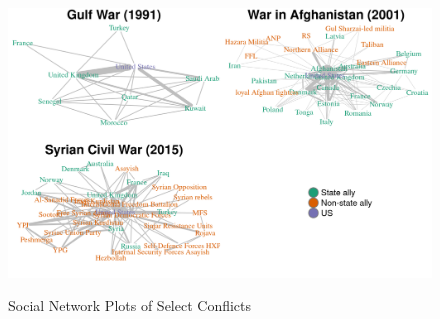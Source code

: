\documentclass[fleqn,12pt]{article}
\begin{document}
\clearpage
{}
\newpage
\begin{figure}[h]
	\begin{center}
		\caption{Social Network Plots of Select Conflicts}
		{\includegraphics[width = \textwidth]{paper/figures/fig-actors-1.png}}
		\label{fig:fig-actors-1}
		\vspace{0.1 in}
	\end{center}
\end{figure}

\clearpage

\newpage


\end{document}
